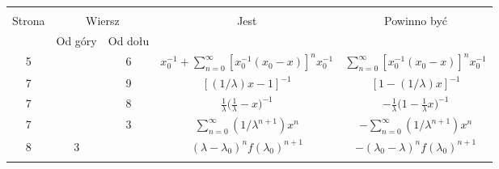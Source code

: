 \documentclass[a4paper,11pt]{article}
\begin{document}
\vspace{\spaceTwo}













\begin{center}

  \begin{tabular}{|c|c|c|c|c|}
    \hline
    & \multicolumn{2}{c|}{} & & \\
    Strona & \multicolumn{2}{c|}{Wiersz}& Jest
                              & Powinno być \\ \cline{2-3}
    & Od góry & Od dołu & & \\
    \hline
    5 & & 6 & $x_{ 0 }^{ -1 } + \sum\limits_{ n = 0 }^{ \infty }
              [ x_{ 0 }^{ -1 } ( x_{ 0 } - x ) ]^{ n } x_{ 0 }^{ -1 }$
           & $\sum\limits_{ n = 0 }^{ \infty } [ x_{ 0 }^{ -1 } ( x_{ 0 } - x ) ]^{ n }
             x_{ 0 }^{ -1 }$ \\
    7 & & 9 & $[ ( 1 / \lambda ) x - 1 ]^{ -1 }$
           & $[ 1 - ( 1 / \lambda ) x ]^{ -1 }$ \\
    7 & & 8 & $\frac{ 1 }{ \lambda } \big( \frac{ 1 }{ \lambda } - x \big)^{ -1 }$
           & $-\frac{ 1 }{ \lambda } \big( 1 - \frac{ 1 }{ \lambda } x \big)^{ -1 }$ \\
    7 & & 3 & $\sum\limits_{ n = 0 }^{ \infty } ( 1 / \lambda^{ n + 1 } ) x^{ n }$
           & $-\sum\limits_{ n = 0 }^{ \infty } ( 1 / \lambda^{ n + 1 } ) x^{ n }$ \\
    8 & 3 & & $( \lambda - \lambda_{ 0 } )^{ n } f( \lambda_{ 0 } )^{ n + 1 }$
           & $-( \lambda_{ 0 } - \lambda )^{ n } f( \lambda_{ 0 } )^{ n + 1 }$ \\
    & & & & \\
    \hline
  \end{tabular}

\end{center}


\vspace{\spaceTwo}












{}






\end{document}
